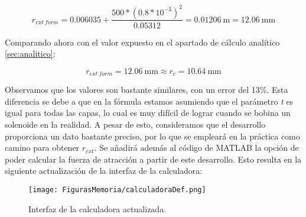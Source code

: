 \[r_{ext~form}=0.006035+\frac{500*(0.8*10^{-3})^2}{0.05312}=0.01206~\text{m}=12.06~\text{mm}\]

Comparando ahora con el valor expuesto en el apartado de cálculo analítico \ref{sec:analitico}:

\[r_{ext~form}=12.06~\text{mm}\approx r_{c}=10.64~\text{mm}\]

Observamos que los valores son bastante similares, con un error del 13\%. Esta diferencia se debe a que en la fórmula estamos asumiendo que el parámetro \textit{t} es igual para todas las capas, lo cual es muy difícil de lograr cuando se bobina un solenoide en la realidad. A pesar de esto, consideramos que el desarrollo proporciona un dato bastante preciso, por lo que se empleará en la práctica como camino para obtener \(r_{ext}\). Se añadirá además al código de MATLAB\textsuperscript{\textregistered}  la opción de poder calcular la fuerza de atracción a partir de este desarrollo. Esto resulta en la siguiente actualización de la interfaz de la calculadora:

\begin{figure}[H]
    \centering
    \texttt{[image: FigurasMemoria/calculadoraDef.png]}
    \caption{Interfaz de la calculadora actualizada.}
    \label{fig:calculadoraDef} %
\end{figure}